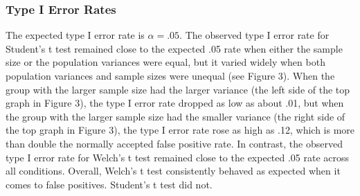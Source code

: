 \documentclass[man,a4paper,noextraspace,apacite]{apa6}
\begin{document}
\subsubsection{Type I Error Rates}

    The expected type I error rate is $\alpha = .05$. The observed type I error 
rate for Student's t test remained close to the expected .05 rate when either 
the sample size or the population variances were equal, but it varied widely 
when both population variances and sample sizes were unequal (see Figure 3). 
When the group with the larger sample size had the larger variance (the left 
side of the top graph in Figure 3), the type I error rate dropped as low as 
about .01, but when the group with the larger sample size had the smaller 
variance (the right side of the top graph in Figure 3), the type I error rate 
rose as high as .12, which is more than double the normally accepted false 
positive rate. In contrast, the observed type I error rate for Welch's t test 
remained close to the expected .05 rate across all conditions. Overall, Welch's 
t test consistently behaved as expected when it comes to false positives. 
Student's t test did not.
\end{document}
